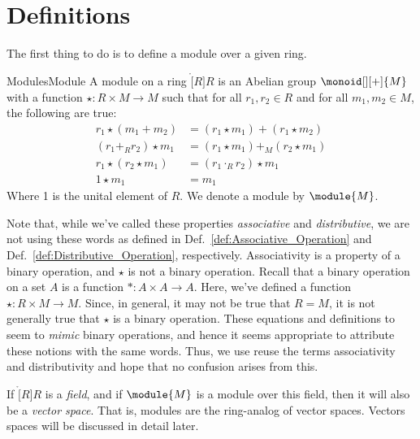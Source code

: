 \section{Definitions}
    The first thing to do is to define a module over a given ring.
    \begin{fdefinition}{Modules}{Module}
        A \gls{module} on a \gls{ring} $\ring[R]{R}$ is an
        \gls{Abelian group} $\monoid[][+]{M}$ with a \gls{function}
        $\star:R\times{M}\rightarrow{M}$ such that for all $r_{1},r_{2}\in{R}$
        and for all $m_{1},m_{2}\in{M}$, the following are true:
        \begin{align}
            r_{1}\star(m_{1}+m_{2})
                &=(r_{1}\star{m}_{1})+(r_{1}\star{m}_{2})
                \tag{Scalar Distributivity}\\
            (r_{1}+_{R}r_{2})\star{m}_{1}
                &=(r_{1}\star{m}_{1})+_{M}(r_{2}\star{m}_{1})
                \tag{Module Distributivity}\\
            r_{1}\star(r_{2}\star{m}_{1})
                &=(r_{1}\cdot_{R}r_{2})\star{m}_{1}
                \tag{Associativity}\\
            1\star{m}_{1}&=m_{1}
            \tag{Identity}
        \end{align}
        Where 1 is the unital element of $R$. We denote a module by
        $\module{M}$.
    \end{fdefinition}
    Note that, while we've called these properties \textit{associative} and
    \textit{distributive}, we are not using these words as defined in
    Def.~\ref{def:Associative_Operation} and
    Def.~\ref{def:Distributive_Operation}, respectively.
    Associativity is a property of a binary operation, and $\star$ is not a
    binary operation. Recall that a binary operation on a set $A$ is a function
    $*:A\times{A}\rightarrow{A}$. Here, we've defined a function
    $\star:R\times{M}\rightarrow{M}$. Since, in general, it may not be true that
    $R=M$, it is not generally true that $\star$ is a binary operation. These
    equations and definitions to seem to \textit{mimic} binary operations, and
    hence it seems appropriate to attribute these notions with the same words.
    Thus, we use reuse the terms associativity and distributivity and hope that
    no confusion arises from this.
    \begin{example}
        If $\ring[R]{R}$ is a \textit{field}, and if
        $\module{M}$ is a module over this field, then it will
        also be a \textit{vector space}. That is, modules
        are the ring-analog of vector spaces. Vectors spaces will be discussed
        in detail later.
    \end{example}

